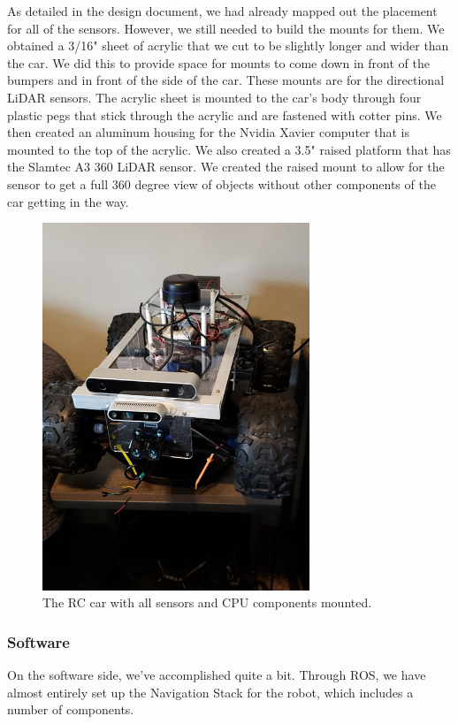 \documentclass[onecolumn, draftclsnofoot, 10pt, compsoc]{IEEEtran}
\begin{document}
As detailed in the design document, we had already mapped out the placement for all of the sensors. However, we still needed to build the mounts for them. We obtained a 3/16" sheet of acrylic that we cut to be slightly longer and wider than the car. We did this to provide space for mounts to come down in front of the bumpers and in front of the side of the car. These mounts are for the directional LiDAR sensors. The acrylic sheet is mounted to the car's body through four plastic pegs that stick through the acrylic and are fastened with cotter pins. We then created an aluminum housing for the Nvidia Xavier computer that is mounted to the top of the acrylic. We also created a 3.5" raised platform that has the Slamtec A3 360 LiDAR sensor. We created the raised mount to allow for the sensor to get a full 360 degree view of objects without other components of the car getting in the way.

\begin{figure}[htp]
    \centering
    \includegraphics[width=8cm]{Baseplate.jpg}
    \caption{The RC car with all sensors and CPU components mounted.}
\end{figure}

\subsubsection{Software}
On the software side, we've accomplished quite a bit. Through ROS, we have almost entirely set up the Navigation Stack for the robot, which includes a number of components.
\end{document}
